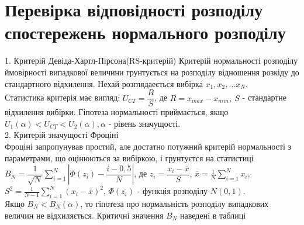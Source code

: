 \documentclass[a4paper,12pt]{article}
\begin{document}
\section{Перевірка відповідності розподілу спостережень нормального розподілу}
1. Критерій Девіда-Хартл-Пірсона(RS-критерій)
Критерій нормальності розподілу ймовірності випадкової величини грунтується на розподілу відношення розкіду до стандартного відхилення. Нехай розглядаеється вибірка $x_1, x_2,...x_N$.\\
Статистика критерія має вигляд: $U_{CT}=\dfrac{R}{S}$, де $R=x_{max}-x_{min},\: S$ - стандартне відхилення вибірки. Гіпотеза нормальності приймається, якщо $U_1(\alpha)<U_{CT}<U_2(\alpha), \alpha$ - рівень значущості.\\
2. Критерій значущості Фроціні\\
Фроціні запропунував простий, але достатно потужний критерій нормальності з параметрами, що оцінюються за вибіркою, і грунтуєтся на статистиці\\
$B_N=\dfrac{1}{\sqrt{N}}\sum\limits^N_{i=1} |\Phi(z_i)-\dfrac{i-0,5}{N}|$, де $z_i=\dfrac{x_i-\overline{x}}{S}$, $\overline{x}=\frac{1}{N}\sum\limits^N_{i=1} x_i$, $S^2=\frac{1}{N-1}\sum\limits^N_{i=1}(x_i-\overline{x})^2$, $\Phi(z_i)$ - функція розподілу $N(0,1)$.\\
Якщо $B_N<B_N(\alpha)$, то гіпотеза про нормальність розподілу випадкових величин не відхиляється. Критичні значення $B_N$ наведенi в таблиці
\end{document}
